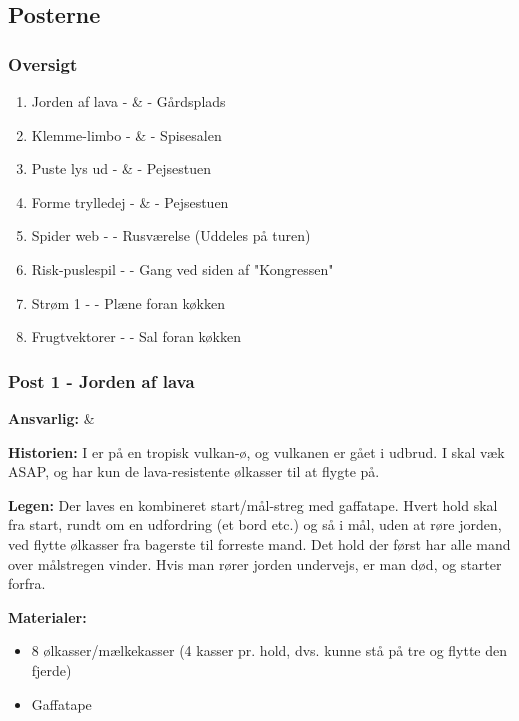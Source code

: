 \subsection{Posterne}

\subsubsection*{Oversigt}
\begin{enumerate}
  \item Jorden af lava - \stive\& \buddha - Gårdsplads
  \item Klemme-limbo - \stive\& \buddha - Spisesalen
  \item Puste lys ud - \clint\& \farav - Pejsestuen
  \item Forme trylledej - \clint\& \farav - Pejsestuen
  \item Spider web - \randildo - Rusværelse (Uddeles på turen)
  \item Risk-puslespil - \hemorides - Gang ved siden af "Kongressen"
  \item Strøm 1 - \mighty - Plæne foran køkken
  \item Frugtvektorer -  - Sal foran køkken
\end{enumerate}

\subsubsection*{Post 1 - Jorden af lava}

\textbf{Ansvarlig:} \Stive \& \Buddha

\textbf{Historien:} I er på en tropisk vulkan-ø, og vulkanen er gået i udbrud. I skal væk ASAP, og har kun de lava-resistente ølkasser til at flygte på.

\textbf{Legen:} Der laves en kombineret start/mål-streg med gaffatape. Hvert hold skal fra start, rundt om en udfordring (et bord etc.) og så i mål, uden at røre jorden, ved flytte ølkasser fra bagerste til forreste mand. Det hold der først har alle mand over målstregen vinder. Hvis man rører jorden undervejs, er man død, og starter forfra.

\textbf{Materialer:}
\begin{itemize}
  \item 8 ølkasser/mælkekasser (4 kasser pr. hold, dvs. kunne stå på tre og flytte den fjerde)
  \item Gaffatape
\end{itemize}

